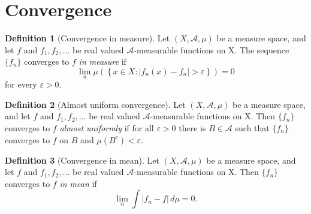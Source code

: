 \documentclass[12pt]{article}
\theoremstyle{definition}
\newtheorem{definition}{Definition}[section]
\newcommand{\eps}{\varepsilon}    %
\newcommand{\algebra}{\mathscr{A}}
\begin{document}
\section{Convergence}
\begin{definition}[Convergence in measure]
    Let $(X,\algebra,\mu)$ be a measure space, and let $f$ and $f_1,f_2,\dots$ be real valued $\algebra$-measurable functions on X. The sequence $\{f_n\}$ converges to $f$ \textit{in measure} if 
    \begin{equation*}
        \lim_n\mu\left(\left\{ x\in X: |f_n(x)-f_n|>\varepsilon\right\} \right)=0
    \end{equation*}
    for every $\eps>0$.
\end{definition}
\begin{definition}[Almost uniform convergence]
    Let $(X,\algebra,\mu)$ be a measure space, and let $f$ and $f_1,f_2,\dots$ be real valued $\algebra$-measurable functions on X. Then $\{f_n\}$ converges to $f$ \textit{almost uniformly} if for all $\eps>0$ there is $B\in \algebra$ such that $\{f_n\}$ converges to $f$ on $B$ and $\mu(B^c)<\eps$.
\end{definition}
\begin{definition}[Convergence in mean]
    Let $(X,\algebra,\mu)$ be a measure space, and let $f$ and $f_1,f_2,\dots$ be real valued $\algebra$-measurable functions on X. Then $\{f_n\}$ converges to $f$ \textit{in mean} if 
    \begin{equation*}
        \lim_n \int |f_n-f| \, d\mu =0.
    \end{equation*}
\end{definition}
\end{document}
